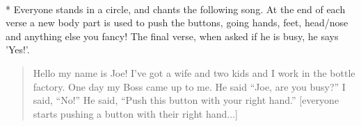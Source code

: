\begin{minipage}{\textwidth}
\\*
Everyone stands in a circle, and chants the following song.  At the end of each verse a new body part is used to push the buttons, going hands, feet, head/nose and anything else you fancy!  The final verse, when asked if he is busy, he says 'Yes!'.

\begin{quote}
Hello my name is Joe!
I've got a wife and two kids and I work in the bottle factory.
One day my Boss came up to me.
He said ``Joe, are you busy?'' I said, ``No!''
He said, ``Push this button with your right hand.''
[everyone starts pushing a button with their right hand...]
\end{quote}


\end{minipage}    \vfill
